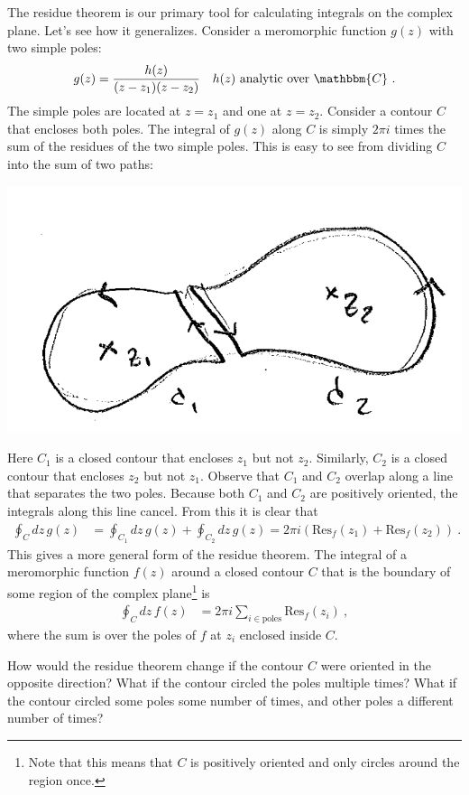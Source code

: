 The residue theorem is our primary tool for calculating integrals on the complex plane. Let's see how it generalizes. Consider a meromorphic function $g(z)$ with two simple poles:
\begin{align}
	g(z) &= \frac{h(z)}{(z-z_1)(z-z_2)} 
	&
	h(z) \text{ analytic over }\mathbbm{C} \ .
\end{align}
The simple poles are located at $z=z_1$ and one at $z=z_2$. Consider a contour $C$ that encloses both poles. The integral of $g(z)$ along $C$ is simply $2\pi i$ times the sum of the residues of the two simple poles. This is easy to see from dividing $C$ into the sum of two paths:
\begin{center}
\includegraphics[width=.5\textwidth]{figures/Lec_2017_13_2poles.png}
\end{center}
Here $C_1$ is a closed contour that encloses $z_1$ but not $z_2$. Similarly, $C_2$ is a closed contour that encloses $z_2$ but not $z_1$. Observe that $C_1$ and $C_2$ overlap along a line that separates the two poles. Because both $C_1$ and $C_2$ are positively oriented, the integrals along this line cancel. From this it is clear that
\begin{align}
	\oint_C dz\, g(z) &=
	\oint_{C_1} dz\, g(z) 
	+
	\oint_{C_2} dz\, g(z)
	= 2\pi i\left(\text{Res}_f(z_1) + \text{Res}_f(z_2)\right) \ .
\end{align}
This gives a more general form of the residue theorem. The integral of a meromorphic function $f(z)$ around a closed contour $C$ that is the boundary of some region of the complex plane\footnote{Note that this means that $C$ is positively oriented and only circles around the region once.} is
\begin{align}
	\oint_C dz\, f(z) &= 2\pi i \sum_{i\in \text{poles}} \text{Res}_f(z_i) \ ,
\end{align}
where the sum is over the poles of $f$ at $z_i$ enclosed inside $C$.
\begin{exercise}
How would the residue theorem change if the contour $C$ were oriented in the opposite direction? What if the contour circled the poles multiple times? What if the contour circled some poles some number of times, and other poles a different number of times?
\end{exercise}


